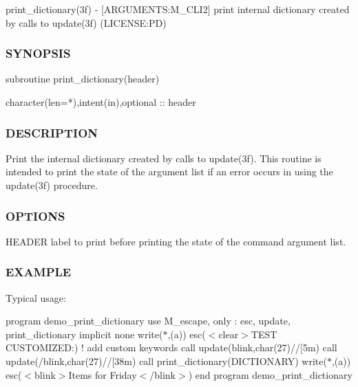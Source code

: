 print\+\_\+dictionary(3f) -\/ \mbox{[}A\+R\+G\+U\+M\+E\+N\+TS\+:M\+\_\+\+C\+L\+I2\mbox{]} print internal dictionary created by calls to update(3f) (L\+I\+C\+E\+N\+SE\+:PD) 

\subsubsection*{S\+Y\+N\+O\+P\+S\+IS}

\begin{DoxyVerb}subroutine print_dictionary(header)

 character(len=*),intent(in),optional :: header
\end{DoxyVerb}


\subsubsection*{D\+E\+S\+C\+R\+I\+P\+T\+I\+ON}

Print the internal dictionary created by calls to update(3f). This routine is intended to print the state of the argument list if an error occurs in using the update(3f) procedure.

\subsubsection*{O\+P\+T\+I\+O\+NS}

H\+E\+A\+D\+ER label to print before printing the state of the command argument list. \subsubsection*{E\+X\+A\+M\+P\+LE}

Typical usage\+:

program demo\+\_\+print\+\_\+dictionary use M\+\_\+escape, only \+: esc, update, print\+\_\+dictionary implicit none write($\ast$,\textquotesingle{}(a)\textquotesingle{}) esc(\textquotesingle{}$<$clear$>$T\+E\+ST C\+U\+S\+T\+O\+M\+I\+Z\+ED\+:\textquotesingle{}) ! add custom keywords call update(\textquotesingle{}blink\textquotesingle{},char(27)//\textquotesingle{}\mbox{[}5m\textquotesingle{}) call update(\textquotesingle{}/blink\textquotesingle{},char(27)//\textquotesingle{}\mbox{[}38m\textquotesingle{}) call print\+\_\+dictionary(\textquotesingle{}D\+I\+C\+T\+I\+O\+N\+A\+RY\textquotesingle{}) write($\ast$,\textquotesingle{}(a)\textquotesingle{}) esc(\textquotesingle{}$<$blink$>$Items for Friday$<$/blink$>$\textquotesingle{}) end program demo\+\_\+print\+\_\+dictionary

